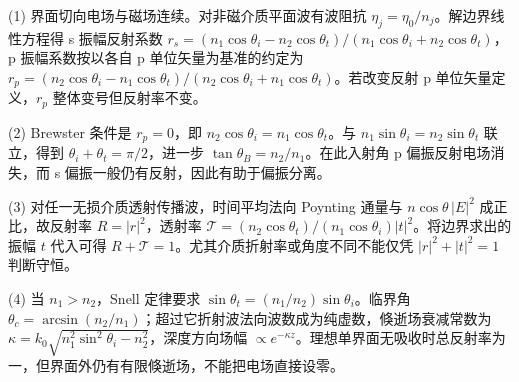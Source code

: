 (1) 界面切向电场与磁场连续。对非磁介质平面波有波阻抗 \(\eta_j=\eta_0/n_j\)。解边界线性方程得 s 振幅反射系数 \(r_s=(n_1\cos\theta_i-n_2\cos\theta_t)/(n_1\cos\theta_i+n_2\cos\theta_t)\)，p 振幅系数按以各自 p 单位矢量为基准的约定为 \(r_p=(n_2\cos\theta_i-n_1\cos\theta_t)/(n_2\cos\theta_i+n_1\cos\theta_t)\)。若改变反射 p 单位矢量定义，\(r_p\) 整体变号但反射率不变。

(2) Brewster 条件是 \(r_p=0\)，即 \(n_2\cos\theta_i=n_1\cos\theta_t\)。与 \(n_1\sin\theta_i=n_2\sin\theta_t\) 联立，得到 \(\theta_i+\theta_t=\pi/2\)，进一步 \(\tan\theta_B=n_2/n_1\)。在此入射角 p 偏振反射电场消失，而 s 偏振一般仍有反射，因此有助于偏振分离。

(3) 对任一无损介质透射传播波，时间平均法向 Poynting 通量与 \(n\cos\theta\,|E|^2\) 成正比，故反射率 \(R=|r|^2\)，透射率 \(\mathcal T=(n_2\cos\theta_t)/(n_1\cos\theta_i)|t|^2\)。将边界求出的振幅 \(t\) 代入可得 \(R+\mathcal T=1\)。尤其介质折射率或角度不同不能仅凭 \(|r|^2+|t|^2=1\) 判断守恒。

(4) 当 \(n_1>n_2\)，Snell 定律要求 \(\sin\theta_t=(n_1/n_2)\sin\theta_i\)。临界角 \(\theta_c=\arcsin(n_2/n_1)\)；超过它折射波法向波数成为纯虚数，倏逝场衰减常数为 \(\kappa=k_0\sqrt{n_1^2\sin^2\theta_i-n_2^2}\)，深度方向场幅 \(\propto e^{-\kappa z}\)。理想单界面无吸收时总反射率为一，但界面外仍有有限倏逝场，不能把电场直接设零。
